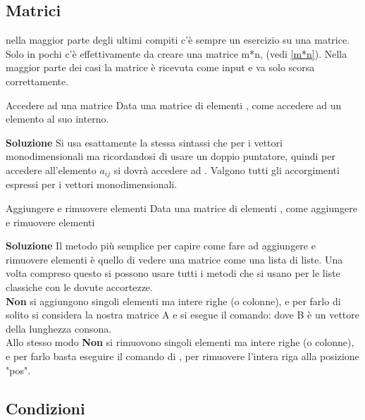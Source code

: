 \documentclass[10pt]{extarticle}
\makeatletter
\newcommand{\<}{\langle}
\renewcommand{\>}{\rangle}
\renewenvironment{proof}[1][\proofname] {\par\pushQED{\qed}
\renewcommand*{\proofname}{Soluzione}
{\normalfont\sffamily\bfseries\topsep6\p@\@plus6\p@\relax #1\@addpunct{.} }}{\popQED\endtrivlist\@endpefalse}
\theoremstyle{mystyle}{\newtheorem*{remark}{Nota}}
\theoremstyle{mystyle}{\newtheorem*{remarks}{Note}}
\theoremstyle{mystyle}{\newtheorem*{example}{Esempio}}
\theoremstyle{mystyle}{\newtheorem*{examples}{Esempi}}
\theoremstyle{definition}{\newtheorem*{exercise}{Exercise}}
\theoremstyle{warn}
\makeatother
\begin{document}
\newpage
\subsection{Matrici}
nella maggior parte degli ultimi compiti c'è sempre un esercizio su una matrice. Solo in pochi c'è effettivamente da creare una matrice m*n, (vedi \ref{m*n}). Nella maggior parte dei casi la matrice è ricevuta come input e va solo scorsa correttamente.

\begin{definition}{Accedere ad una matrice}{}
Data una matrice di elementi , come accedere ad un elemento al suo interno.
\end{definition}
\begin{proof}
Si usa esattamente la stessa sintassi che per i vettori monodimensionali ma ricordandosi di usare un doppio puntatore, quindi per accedere all'elemento $a_{ij}$ si dovrà accedere ad . Valgono tutti gli accorgimenti espressi per i vettori monodimensionali.
\end{proof}

\begin{definition}{Aggiungere e rimuovere elementi}{}
Data una matrice di elementi , come aggiungere e rimuovere elementi
\end{definition}
\begin{proof}
Il metodo più semplice per capire come fare ad aggiungere e rimuovere elementi è quello di vedere una matrice come una lista di liste. Una volta compreso questo si possono usare tutti i metodi che si usano per le liste classiche con le dovute accortezze.\\
\textbf{Non} si aggiungono singoli elementi ma intere righe (o colonne), e per farlo di solito si considera la nostra matrice A e si esegue il comando:  dove B è un vettore della lunghezza consona.\\
Allo stesso modo \textbf{Non} si rimuovono singoli elementi ma intere righe (o colonne), e per farlo basta eseguire il comando di , per rimuovere l'intera riga alla posizione "pos".
\end{proof}

\subsection{Condizioni}
\end{document}
